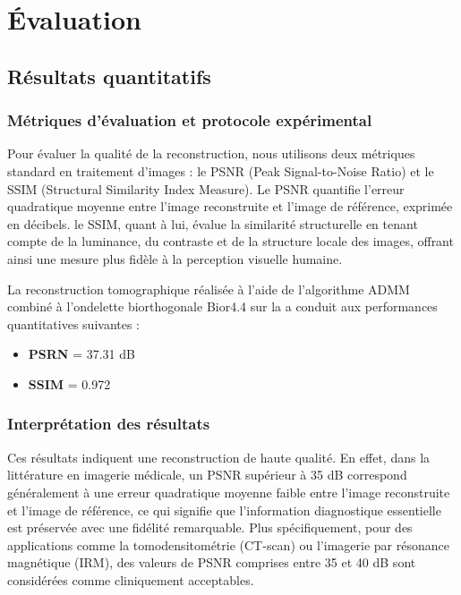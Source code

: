 \section{Évaluation}

\subsection{Résultats quantitatifs}

\subsubsection{Métriques d'évaluation et protocole expérimental}
Pour évaluer la qualité de la reconstruction, nous utilisons deux métriques standard en traitement d'images : le PSNR (Peak Signal-to-Noise Ratio) et le SSIM (Structural Similarity Index Measure). Le PSNR quantifie l'erreur quadratique moyenne entre l'image reconstruite et l'image de référence, exprimée en décibels. le SSIM, quant à lui, évalue la similarité structurelle en tenant compte de la luminance, du contraste et de la structure locale des images, offrant ainsi une mesure plus fidèle à la perception visuelle humaine.

La reconstruction tomographique réalisée à l'aide de l'algorithme ADMM combiné à l'ondelette biorthogonale Bior4.4 sur la   a conduit aux performances quantitatives suivantes :
\begin{itemize}[label=-]
    \item \textbf{PSRN} = 37.31 dB
    \item \textbf{SSIM} = 0.972
\end{itemize}

\subsubsection{Interprétation des résultats}
Ces résultats indiquent une reconstruction de haute qualité. En effet, dans la littérature en imagerie médicale, un PSNR supérieur à 35 dB correspond généralement à une erreur quadratique moyenne faible entre l'image reconstruite et l'image de référence, ce qui signifie que l'information diagnostique essentielle est préservée avec une fidélité remarquable. Plus spécifiquement, pour des applications comme la tomodensitométrie (CT-scan) ou l'imagerie par résonance magnétique (IRM), des valeurs de PSNR comprises entre 35 et 40 dB sont considérées comme cliniquement acceptables.

